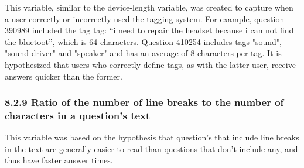 \documentclass{article}
\begin{document}
This variable, similar to the device-length variable, was created to capture when a user correctly or incorrectly used the tagging system. For example, question 390989 included the tag tag: “i need to repair the headset because i can not find the bluetoot”, which is 64 characters. Question 410254 includes tags "sound", "sound driver" and "speaker" and has an average of 8 characters per tag. It is hypothesized that users who correctly define tags, as with the latter user, receive answers quicker than the former. 

\subsubsection*{8.2.9 Ratio of the number of line breaks to the number of characters in a question's text}

This variable was based on the hypothesis that question's that include line breaks in the text are generally easier to read than questions that don't include any, and thus have faster answer times. 






\end{document}
